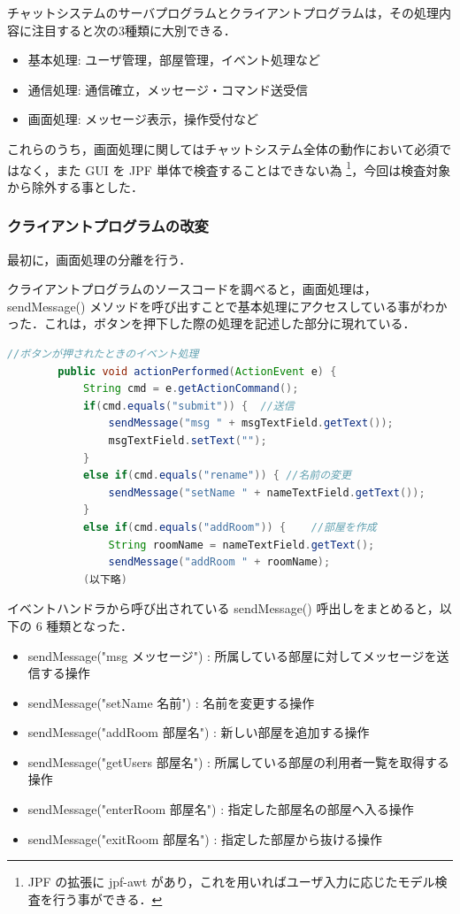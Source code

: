 \documentclass[a4j,12pt]{jarticle}
\begin{document}
チャットシステムのサーバプログラムとクライアントプログラムは，その処理内容に注目すると次の3種類に大別できる．

\newpage

\begin{itemize}
\item 基本処理: ユーザ管理，部屋管理，イベント処理など
\item 通信処理: 通信確立，メッセージ・コマンド送受信
\item 画面処理: メッセージ表示，操作受付など
\end{itemize}

これらのうち，画面処理に関してはチャットシステム全体の動作において必須ではなく，また GUI を JPF 単体で検査することはできない為 \footnote{JPF の拡張に jpf-awt があり，これを用いればユーザ入力に応じたモデル検査を行う事ができる．}，今回は検査対象から除外する事とした．

\subsubsection{クライアントプログラムの改変}

最初に，画面処理の分離を行う．

クライアントプログラムのソースコードを調べると，画面処理は，sendMessage() メソッドを呼び出すことで基本処理にアクセスしている事がわかった．これは，ボタンを押下した際の処理を記述した部分に現れている．

\begin{lstlisting}[label=src:client-event, caption=クライアントプログラムのイベントハンドラ,language=Java]
    //ボタンが押されたときのイベント処理
        public void actionPerformed(ActionEvent e) {
            String cmd = e.getActionCommand();
            if(cmd.equals("submit")) {	//送信
                sendMessage("msg " + msgTextField.getText());
                msgTextField.setText("");
            }
            else if(cmd.equals("rename")) {	//名前の変更
                sendMessage("setName " + nameTextField.getText());
            }
            else if(cmd.equals("addRoom")) {	//部屋を作成
                String roomName = nameTextField.getText();
                sendMessage("addRoom " + roomName);
            (以下略)
\end{lstlisting}

イベントハンドラから呼び出されている sendMessage() 呼出しをまとめると，以下の 6 種類となった．

\newpage

\begin{itemize}
\item sendMessage("msg メッセージ") : 所属している部屋に対してメッセージを送信する操作
\item sendMessage("setName 名前") : 名前を変更する操作
\item sendMessage("addRoom 部屋名") : 新しい部屋を追加する操作
\item sendMessage("getUsers 部屋名") : 所属している部屋の利用者一覧を取得する操作
\item sendMessage("enterRoom 部屋名") : 指定した部屋名の部屋へ入る操作
\item sendMessage("exitRoom 部屋名") : 指定した部屋から抜ける操作
\end{itemize}
\end{document}
